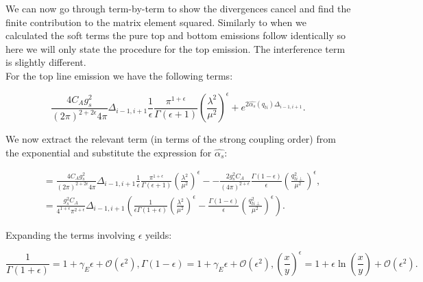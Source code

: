 			We can now go through term-by-term to show the divergences cancel and find the finite contribution to the matrix element squared.  Similarly to when we calculated the soft terms the pure top and bottom emissions follow identically so here we will only state the procedure for the top emission.  The interference term is slightly different.\\For the top line emission we have the following terms:

			\begin{equation}
			\frac{4C_Ag_s^2}{(2\pi)^{2+2\epsilon}4\pi}\Delta_{i-1, i+1}\frac{1}{\epsilon}\frac{\pi^{1+\epsilon}}{\Gamma(\epsilon+1)}\left(\frac{\lambda^2}{\mu^2}\right)^\epsilon + e^{2\hat{\alpha_s}(q_{ti})\Delta_{i-1,i+1}}.
			\end{equation}

			We now extract the relevant term (in terms of the strong coupling order) from the exponential and substitute the expression for $\hat{\alpha_s}$:

			\begin{align}
			&= \frac{4C_Ag_s^2}{(2\pi)^{2+2\epsilon}4\pi}\Delta_{i-1, i+1}\frac{1}{\epsilon}\frac{\pi^{1+\epsilon}}{\Gamma(\epsilon+1)}\left(\frac{\lambda^2}{\mu^2}\right)^\epsilon - -\frac{2g_s^2C_A}{(4\pi)^{2+\epsilon}}\frac{\Gamma(1-\epsilon)}{\epsilon}\left(\frac{q_{ti\perp}^2}{\mu^2}\right)^\epsilon, \\
			&= \frac{g_s^2C_A}{4^{1+\epsilon}\pi^{2+\epsilon}}\Delta_{i-1, i+1}\left(\frac{1}{\epsilon\Gamma(1+\epsilon)}\left(\frac{\lambda^2}{\mu^2}\right)^\epsilon - \frac{\Gamma(1-\epsilon)}{\epsilon}\left(\frac{q_{ti\perp}^2}{\mu^2}\right)^\epsilon\right).
			\end{align}

			Expanding the terms involving $\epsilon$ yeilds:

			\begin{subequations}
			\begin{equation}
			\frac{1}{\Gamma(1+\epsilon)} = 1 + \gamma_E\epsilon + \mathcal{O}(\epsilon^2),
			\end{equation}
			\begin{equation}
			\Gamma(1-\epsilon) = 1 + \gamma_E\epsilon + \mathcal{O}(\epsilon^2),
			\end{equation}
			\begin{equation}
			\left(\frac{x}{y}\right)^\epsilon = 1 + \epsilon\ln\left(\frac{x}{y}\right) + \mathcal{O}(\epsilon^2).
			\end{equation}
			\end{subequations}

